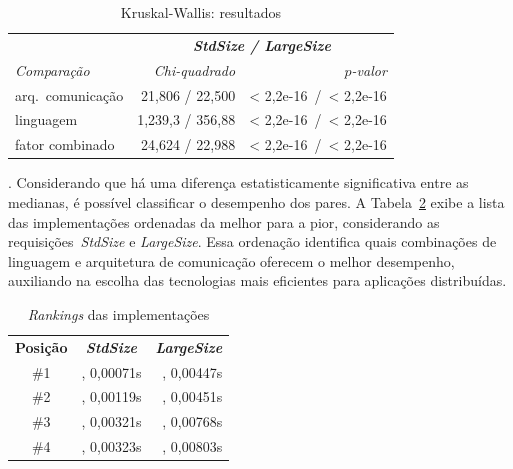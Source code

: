 \begin{table}[!ht]
    \centering
    \small
    \caption{Kruskal-Wallis: resultados}
    \vspace{-8pt}
    \begin{tabular}{lrr}
        & \multicolumn{2}{c}{\textbf{\em StdSize / LargeSize}} \\
        \textit{Comparação} & \textit{Chi-quadrado} & \textit{$p$-valor} \\

        arq.~comunicação & 21,806 / 22,500 & < 2,2e-16~/~< 2,2e-16 \\
        linguagem & 1,239,3 / 356,88 & < 2,2e-16~/~< 2,2e-16 \\
        fator combinado & 24,624 / 22,988 & < 2,2e-16~/~< 2,2e-16 \\
    \end{tabular}
    \label{tab:kruskal}
\end{table}

. Considerando que há uma diferença estatisticamente significativa entre as medianas, é possível classificar o desempenho dos pares.
A Tabela~\ref{tab:rankings} exibe a lista das implementações ordenadas da melhor para a pior, considerando as requisições~\textit{StdSize} e \textit{LargeSize}. Essa ordenação identifica quais combinações de linguagem e arquitetura de comunicação oferecem o melhor desempenho, auxiliando na escolha das tecnologias mais eficientes para aplicações distribuídas.

\begin{table}[!ht]
    \centering
    \small
    \caption{{\em Rankings} das implementações}
    \vspace{-8pt}
    \begin{tabular}{crr}
        \textbf{Posição} & \multicolumn{1}{c}{\textbf{\textit{StdSize}}} & \multicolumn{1}{c}{\textbf{\textit{LargeSize}}} \\
        \#1 & \gogrpc{}, 0,00071s & \gorest{}, 0,00447s \\
        \#2 & \javagrpc{}, 0,00119s & \javarest{}, 0,00451s \\
        \#3 & \javarest{}, 0,00321s & \gogrpc{}, 0,00768s \\
        \#4 & \gorest{}, 0,00323s &\javagrpc{}, 0,00803s \\
    \end{tabular}
    \label{tab:rankings}
\end{table}

